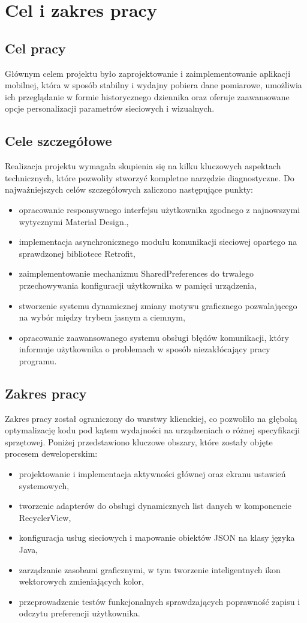 \chapter{Cel i zakres pracy}

\section{Cel pracy}
Głównym celem projektu było zaprojektowanie i zaimplementowanie aplikacji mobilnej, która w sposób stabilny i wydajny pobiera dane pomiarowe, umożliwia ich przeglądanie w formie historycznego dziennika oraz oferuje zaawansowane opcje personalizacji parametrów sieciowych i wizualnych.
\section{Cele szczegółowe}
Realizacja projektu wymagała skupienia się na kilku kluczowych aspektach technicznych, które pozwoliły stworzyć kompletne narzędzie diagnostyczne. Do najważniejszych celów szczegółowych zaliczono następujące punkty:
\begin{itemize}
    \item opracowanie responsywnego interfejsu użytkownika zgodnego z najnowszymi wytycznymi Material Design.,
    \item implementacja asynchronicznego modułu komunikacji sieciowej opartego na sprawdzonej bibliotece Retrofit,
    \item zaimplementowanie mechanizmu SharedPreferences do trwałego przechowywania konfiguracji użytkownika w pamięci urządzenia,
    \item stworzenie systemu dynamicznej zmiany motywu graficznego pozwalającego na wybór między trybem jasnym a ciemnym,
    \item opracowanie zaawansowanego systemu obsługi błędów komunikacji, który informuje użytkownika o problemach w sposób niezakłócający pracy programu.
\end{itemize}

\section{Zakres pracy}
Zakres pracy został ograniczony do warstwy klienckiej, co pozwoliło na głęboką optymalizację kodu pod kątem wydajności na urządzeniach o różnej specyfikacji sprzętowej. Poniżej przedstawiono kluczowe obszary, które zostały objęte procesem deweloperskim:
\begin{itemize}
    \item projektowanie i implementacja aktywności głównej oraz ekranu ustawień systemowych,
    \item tworzenie adapterów do obsługi dynamicznych list danych w komponencie RecyclerView,
    \item konfiguracja usług sieciowych i mapowanie obiektów JSON na klasy języka Java,
    \item zarządzanie zasobami graficznymi, w tym tworzenie inteligentnych ikon wektorowych zmieniających kolor,
    \item przeprowadzenie testów funkcjonalnych sprawdzających poprawność zapisu i odczytu preferencji użytkownika.
\end{itemize}